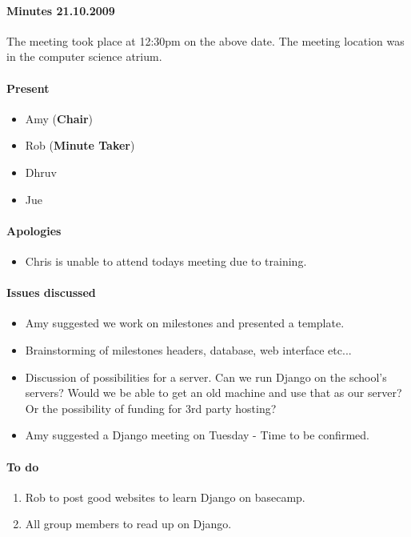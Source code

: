 \paragraph{Minutes 21.10.2009}  
The meeting took place at 12:30pm on the above date. The meeting location was in the computer science atrium. 

\paragraph{Present}

\begin{itemize}
	\item Amy (\textbf{Chair})
	\item Rob (\textbf{Minute Taker})
	\item Dhruv 
	\item Jue
	
\end{itemize}


\paragraph{Apologies}

\begin{itemize}
	\item Chris is unable to attend todays meeting due to training.
\end{itemize}


\paragraph{Issues discussed}

\begin{itemize}
	\item  Amy suggested we work on milestones and presented a template. 
	\item Brainstorming of milestones headers, database, web interface etc...
	\item Discussion of possibilities for a server. Can we run Django on the school's servers? Would we be able to get an old machine and use that as our server? Or the possibility of funding for 3rd party hosting?
	\item Amy suggested a Django meeting on Tuesday - Time to be confirmed. 
\end{itemize}

\paragraph{To do}

\begin{enumerate}
	\item Rob to post good websites to learn Django on basecamp.  
	\item All group members to read up on Django.  
\end{enumerate}

